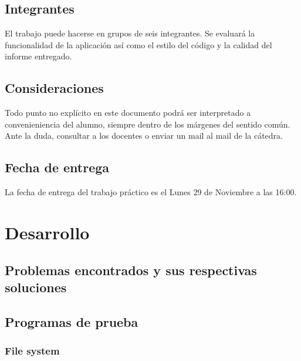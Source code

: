 \documentclass[a4paper,10pt]{article}
\begin{document}
\subsection{Integrantes}
El trabajo puede hacerse en grupos de seis integrantes. Se evaluará la funcionalidad
de la aplicación así como el estilo del código y la calidad del informe entregado.

\subsection{Consideraciones}
Todo punto no explícito en este documento podrá ser interpretado a convenieniencia
del alumno, siempre dentro de los márgenes del sentido común. Ante la
duda, consultar a los docentes o enviar un mail al mail de la cátedra.

\subsection{Fecha de entrega}
La fecha de entrega del trabajo práctico es el Lunes 29 de Noviembre a las 16:00.



\newpage


\section{Desarrollo}

\subsection{Problemas encontrados y sus respectivas soluciones}

\subsection{Programas de prueba}

  \subsubsection{File system}
\end{document}
